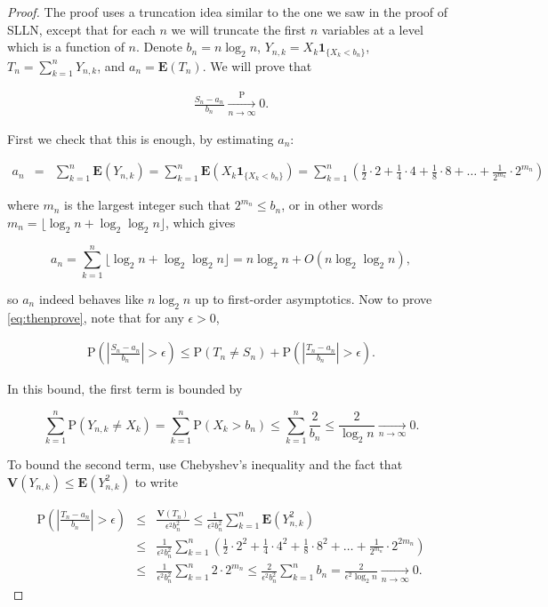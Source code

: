 \documentclass[11pt]{report}
\theoremstyle{plain}
\theoremstyle{definition}
\begin{document}
\begin{proof}
The proof uses a truncation idea similar to the one
we saw in the proof of SLLN, except that for each $n$
we will truncate the first $n$ variables at a level
which is a function of $n$. Denote $b_n = n\log_2 n$,
$Y_{n,k} = X_k \mathbf{1}_{\{X_k<b_n\}}$,
$T_n=\sum_{k=1}^n Y_{n,k}$, and
$a_n = \mathbf{E}(T_n)$. We will prove that

\begin{align*}
\tag{10}\label{eq:thenprove}
\frac{S_n-a_n}{b_n}\xrightarrow[n\to\infty]{\mathrm{P}} 0.
\end{align*}

\noindent First we check that this is enough, by estimating
$a_n$:

\begin{eqnarray*}
a_n &=& \sum_{k=1}^n \mathbf{E}(Y_{n,k}) = \sum_{k=1}^n \mathbf{E}(X_k \mathbf{1}_{\{X_k<b_n\}})
= \sum_{k=1}^n \left(\frac12\cdot 2 + \frac14\cdot 4 + \frac18 \cdot 8 + \ldots + \frac{1}{2^{m_{n}}}\cdot 2^{m_{n}}
\right)
\end{eqnarray*}

\noindent where $m_n$ is the largest integer such that
$2^{m_n} \le b_n$, or in other words
$m_n = \lfloor \log_2 n + \log_2 \log_2 n \rfloor$,
which gives

\[
a_n = \sum_{k=1}^n \lfloor \log_2 n + \log_2 \log_2 n \rfloor = n \log_2 n + O(n \log_2 \log_2 n),
\]

\noindent so $a_n$ indeed behaves like $n\log_2 n$ up to
first-order asymptotics. Now to prove
\eqref{eq:thenprove}, note that for any $\epsilon>0$,

\begin{align*}
\tag{11}\label{eq:lhs}
\mathrm{P}\left( \left|\frac{S_n-a_n}{b_n}\right| > \epsilon\right) \le
\mathrm{P}(T_n\neq S_n) + \mathrm{P}\left( \left|\frac{T_n-a_n}{b_n}\right| > \epsilon\right).
\end{align*}

\noindent In this bound, the first term is bounded by

\[
\sum_{k=1}^n \mathrm{P}(Y_{n,k}\neq X_k) = \sum_{k=1}^n \mathrm{P}(X_k>b_n) \le \sum_{k=1}^n \frac{2}{b_n}
\le \frac{2}{\log_2 n} \xrightarrow[n\to\infty]{} 0.
\]

\noindent To bound the second term, use Chebyshev's inequality
and the fact that
$\mathbf{V}(Y_{n,k})\le \mathbf{E}(Y_{n,k}^2)$ to
write

\begin{eqnarray*}
\mathrm{P}\left( \left|\frac{T_n-a_n}{b_n}\right| > \epsilon\right) &\le& \frac{\mathbf{V}(T_n)}{\epsilon^2 b_n^2}
\le \frac{1}{\epsilon^2 b_n^2} \sum_{k=1}^n \mathbf{E}(Y_{n,k}^2) \\
&\le& \frac{1}{\epsilon^2 b_n^2} \sum_{k=1}^n
\left(\frac12\cdot 2^2 + \frac14\cdot 4^2 + \frac18 \cdot 8^2 + \ldots + \frac{1}{2^{m_{n}}}\cdot 2^{2m_{n}} \right) \\
&\le&
\frac{1}{\epsilon^2 b_n^2} \sum_{k=1}^n 2\cdot 2^{m_n}
\le \frac{2}{\epsilon^2 b_n^2} \sum_{k=1}^n b_n = \frac{2}{\epsilon^2 \log_2 n} \xrightarrow[n\to\infty]{} 0.
\end{eqnarray*}


\end{proof}
\end{document}
